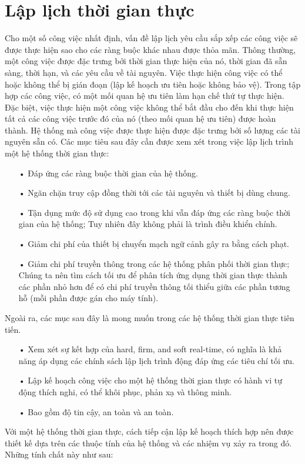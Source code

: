 \documentclass[a4paper,10pt]{report}
\begin{document}
\section{Lập lịch thời gian thực}
Cho một số công việc nhất định, vấn đề lập lịch yêu cầu sắp xếp các công việc sẽ được thực hiện sao cho các ràng buộc khác nhau được thỏa mãn. Thông thường, một công việc được đặc trưng bởi thời gian thực hiện của nó, thời gian đã sẵn sàng, thời hạn, và các yêu cầu về tài nguyên. Việc thực hiện công việc có thể hoặc không thể bị gián đoạn (lập kế hoạch ưu tiên hoặc không bảo vệ). Trong tập hợp các công việc, có một mối quan hệ ưu tiên làm hạn chế thứ tự thực hiện. Đặc biệt, việc thực hiện một công việc không thể bắt đầu cho đến khi thực hiện tất cả các công việc trước đó của nó (theo mối quan hệ ưu tiên) được hoàn thành. Hệ thống mà công việc được thực hiện được đặc trưng bởi số lượng các tài nguyên sẵn có. Các mục tiêu sau đây cần được xem xét trong việc lập lịch trình một hệ thống thời gian thực:
\begin{itemize}
\item[•] Đáp ứng các ràng buộc thời gian của hệ thống.
\item[•] Ngăn chặn truy cập đồng thời tới các tài nguyên và thiết bị dùng chung.
\item[•] Tận dụng mức độ sử dụng cao trong khi vẫn đáp ứng các ràng buộc thời gian của hệ thống; Tuy nhiên đây không phải là trình điều khiển chính.
\item[•] Giảm chi phí của thiết bị chuyển mạch ngữ cảnh gây ra bằng cách phạt.
\item[•] Giảm chi phí truyền thông trong các hệ thống phân phối thời gian thực; Chúng ta nên tìm cách tối ưu để phân tích ứng dụng thời gian thực thành các phần nhỏ hơn để có chi phí truyền thông tối thiểu giữa các phần tương hỗ (mỗi phần được gán cho máy tính).
\end{itemize}
Ngoài ra, các mục sau đây là mong muốn trong các hệ thống thời gian thực tiên tiến.
\begin{itemize}
\item[•] Xem xét sự kết hợp của hard, firm, and soft real-time, có nghĩa là khả năng áp dụng các chính sách lập lịch trình động đáp ứng các tiêu chí tối ưu.
\item[•] Lập kế hoạch công việc cho một hệ thống thời gian thực có hành vi tự động thích nghi, có thể khôi phục, phản xạ và thông minh.
\item[•] Bao gồm độ tin cậy, an toàn và an toàn.
\end{itemize}
Với một hệ thống thời gian thực, cách tiếp cận lập kế hoạch thích hợp nên được thiết kế dựa trên các thuộc tính của hệ thống và các nhiệm vụ xảy ra trong đó. Những tính chất này như sau:
\end{document}
